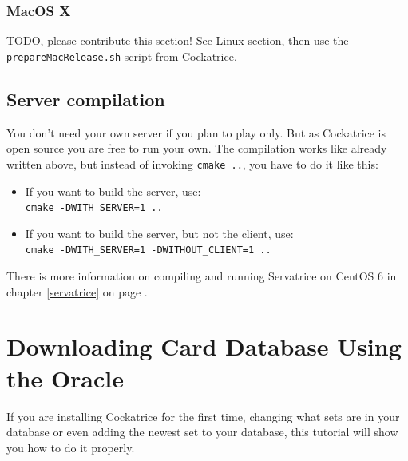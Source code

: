 \documentclass[a4paper]{scrbook}
\newcommand{\shellcmd}[1]{\texttt{\scriptsize #1}}
\begin{document}
\subsubsection{MacOS X}
TODO, please contribute this section! See Linux section, then use the \shellcmd{prepareMacRelease.sh} script from Cockatrice.

\subsection{Server compilation}
You don't need your own server if you plan to play only. But as Cockatrice is open source you are free to run your own.
The compilation works like already written above, but instead of invoking \shellcmd{cmake ..}, you have to do it like this:
\begin{itemize}
 \item If you want to build the server, use:\\ \shellcmd{cmake -DWITH\_SERVER=1 ..}
 \item If you want to build the server, but not the client, use:\\ \shellcmd{cmake -DWITH\_SERVER=1 -DWITHOUT\_CLIENT=1 ..}
\end{itemize}
There is more information on compiling and running Servatrice on CentOS 6 in chapter \ref{servatrice} on page \pageref{servatrice}.

\section{Downloading Card Database Using the Oracle}
If you are installing Cockatrice for the first time, changing what sets are in your database or even adding the newest set to your database, this tutorial will show you how to do it properly.
\end{document}
